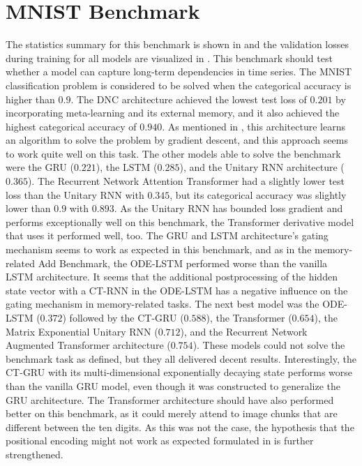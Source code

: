 \documentclass[draft,final]{vutinfth} %
\begin{document}
    \section{MNIST Benchmark} \label{mnist_results}
    The statistics summary for this benchmark is shown in  and the validation losses during training for all models are visualized in .
    This benchmark should test whether a model can capture long-term dependencies in time series.
    The MNIST classification problem is considered to be solved when the categorical accuracy is higher than $0.9$.
    The DNC architecture achieved the lowest test loss of $0.201$ by incorporating meta-learning and its external memory, and it also achieved the highest categorical accuracy of $0.940$.
    As mentioned in , this architecture learns an algorithm to solve the problem by gradient descent, and this approach seems to work quite well on this task.
    The other models able to solve the benchmark were the GRU ($0.221$), the LSTM ($0.285$), and the Unitary RNN architecture ($0.365$).
    The Recurrent Network Attention Transformer had a slightly lower test loss than the Unitary RNN with $0.345$, but its categorical accuracy was slightly lower than $0.9$ with $0.893$.
    As the Unitary RNN has bounded loss gradient and performs exceptionally well on this benchmark, the Transformer derivative model that uses it performed well, too.
    The GRU and LSTM architecture's gating mechanism seems to work as expected in this benchmark, and as in the memory-related Add Benchmark, the ODE-LSTM performed worse than the vanilla LSTM architecture.
    It seems that the additional postprocessing of the hidden state vector with a CT-RNN in the ODE-LSTM has a negative influence on the gating mechanism in memory-related tasks.
    The next best model was the ODE-LSTM ($0.372$) followed by the CT-GRU ($0.588$), the Transformer ($0.654$), the Matrix Exponential Unitary RNN ($0.712$), and the Recurrent Network Augmented Transformer architecture ($0.754$).
    These models could not solve the benchmark task as defined, but they all delivered decent results.
    Interestingly, the CT-GRU with its multi-dimensional exponentially decaying state performs worse than the vanilla GRU model, even though it was constructed to generalize the GRU architecture.
    The Transformer architecture should have also performed better on this benchmark, as it could merely attend to image chunks that are different between the ten digits.
    As this was not the case, the hypothesis that the positional encoding might not work as expected formulated in  is further strengthened.
\end{document}

